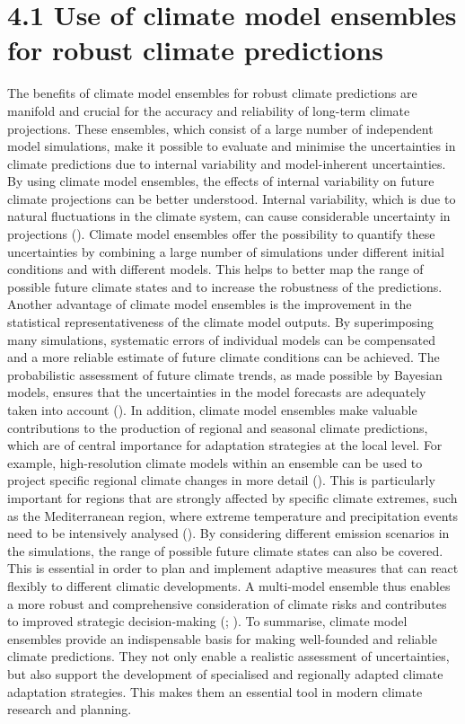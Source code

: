 \documentclass[
]{krantz}
\begin{document}
\section{4.1 Use of climate model ensembles for robust climate predictions}\label{use-of-climate-model-ensembles-for-robust-climate-predictions}

The benefits of climate model ensembles for robust climate predictions are manifold and crucial for the accuracy and reliability of long-term climate projections. These ensembles, which consist of a large number of independent model simulations, make it possible to evaluate and minimise the uncertainties in climate predictions due to internal variability and model-inherent uncertainties.
By using climate model ensembles, the effects of internal variability on future climate projections can be better understood. Internal variability, which is due to natural fluctuations in the climate system, can cause considerable uncertainty in projections (\citet{deser}). Climate model ensembles offer the possibility to quantify these uncertainties by combining a large number of simulations under different initial conditions and with different models. This helps to better map the range of possible future climate states and to increase the robustness of the predictions.
Another advantage of climate model ensembles is the improvement in the statistical representativeness of the climate model outputs. By superimposing many simulations, systematic errors of individual models can be compensated and a more reliable estimate of future climate conditions can be achieved. The probabilistic assessment of future climate trends, as made possible by Bayesian models, ensures that the uncertainties in the model forecasts are adequately taken into account (\citet{smith2009bayesian}).
In addition, climate model ensembles make valuable contributions to the production of regional and seasonal climate predictions, which are of central importance for adaptation strategies at the local level. For example, high-resolution climate models within an ensemble can be used to project specific regional climate changes in more detail (\citet{croce2021enhancing}). This is particularly important for regions that are strongly affected by specific climate extremes, such as the Mediterranean region, where extreme temperature and precipitation events need to be intensively analysed (\citet{croce2021enhancing}).
By considering different emission scenarios in the simulations, the range of possible future climate states can also be covered. This is essential in order to plan and implement adaptive measures that can react flexibly to different climatic developments. A multi-model ensemble thus enables a more robust and comprehensive consideration of climate risks and contributes to improved strategic decision-making (\citet{deser}; \citet{smith2009bayesian}).
To summarise, climate model ensembles provide an indispensable basis for making well-founded and reliable climate predictions. They not only enable a realistic assessment of uncertainties, but also support the development of specialised and regionally adapted climate adaptation strategies. This makes them an essential tool in modern climate research and planning.
\end{document}
